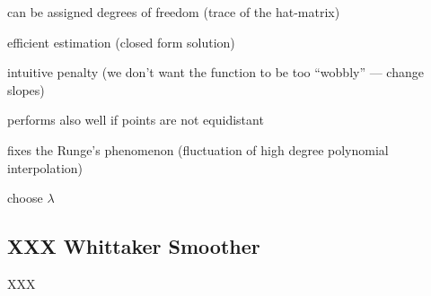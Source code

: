 \begin{my_pros_cons_table}{
		\item can be assigned degrees of freedom (trace of the hat-matrix)
		\item efficient estimation (closed form solution)
		\item intuitive penalty (we don't want the function to be too ``wobbly'' --- change slopes)
		\item performs also well if points are not equidistant
		\item fixes the Runge's phenomenon (fluctuation of high degree polynomial interpolation)
	}{
		\item choose $\lambda$
	}
\end{my_pros_cons_table}


\subsection{XXX Whittaker Smoother}
\label{sec:whittaker}
XXX


